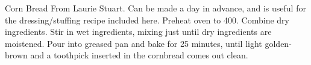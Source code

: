 \begin{recipe}{Corn Bread}{}{}
\freeform From Laurie Stuart.  Can be made a day in advance, and is useful for the dressing/stuffing recipe included here.
\newstep Preheat oven to 400\0.
Combine dry ingredients.
Stir in wet ingredients, mixing just until dry ingredients are moistened.  Pour into greased pan and bake for 25 minutes, until light golden-brown and a toothpick inserted in the cornbread comes out clean.
\end{recipe}
